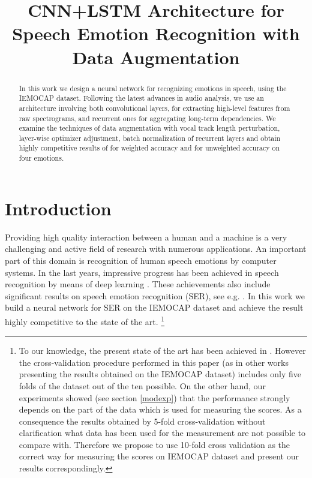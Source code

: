 \documentclass[a4paper]{article}
\title{CNN+LSTM Architecture for Speech Emotion Recognition with Data Augmentation}
\date{}
\begin{document}
\maketitle
\begin{abstract}
In this work we design a neural network for recognizing emotions in speech, using the IEMOCAP dataset. 
Following the latest advances in audio analysis, we use an architecture involving both convolutional layers, for extracting high-level features 
from raw spectrograms, and recurrent ones for aggregating long-term dependencies. We examine the techniques of data augmentation with vocal track length perturbation, 
layer-wise optimizer adjustment, batch normalization of recurrent layers and obtain highly competitive results of  for weighted accuracy and  for
unweighted accuracy on four emotions.
\end{abstract}


\section{Introduction}
Providing high quality interaction between a human and a machine is a very challenging and active field of research with numerous applications. 
An important part of this domain is recognition of human speech emotions by computer systems. In the last years, impressive progress has been achieved in 
speech recognition by means of deep learning \cite{Baidu,Medennikov+2016,Saon+2016,gatedCNN}. These achievements also include significant results on speech 
emotion recognition (SER), see e.g. \cite{KimLP13,microsoft,tspredictor}. 
In this work we build a neural network for SER on the IEMOCAP dataset \cite{Busso2008} and achieve the result highly competitive to the state of the art. 
\footnote{To our knowledge, the present state of the art has been achieved in \cite{microsoft}. However the cross-validation procedure performed in this 
paper (as in other works presenting the results obtained on the IEMOCAP dataset) includes only five folds of the dataset out of the ten 
possible. On the other hand, our experiments showed (see section \ref{modexp}) that the performance strongly depends on the part of the data which is used 
for measuring the scores. As a consequence the results obtained by 5-fold cross-validation without clarification what data has been used for the measurement 
are not possible to compare with. 
Therefore we propose to use 10-fold cross validation as the correct way for measuring the scores on IEMOCAP dataset and present our results correspondingly.} 
\end{document}
